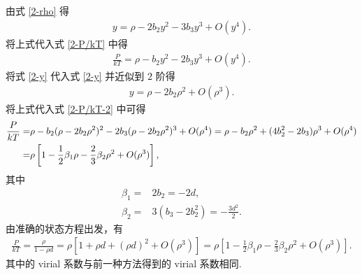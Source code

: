 \documentclass{assignment}
\begin{document}
\begin{sol}
    由式 \eqref{2-rho} 得
    \begin{align}
        \label{2-y}
        y=\rho-2b_2y^2-3b_3y^3+O(y^4).
    \end{align}
    将上式代入式 \eqref{2-P/kT} 中得
    \begin{align}
        \label{2-P/kT-2}
        \frac{P}{kT}=\rho-b_2y^2-2b_3y^3+O(y^4).
    \end{align}
    将式 \eqref{2-y} 代入式 \eqref{2-y} 并近似到 $2$ 阶得
    \begin{align}
        y=\rho-2b_2\rho^2+O(\rho^3).
    \end{align}
    将上式代入式 \eqref{2-P/kT-2} 中可得
    \begin{align}
        \notag\frac{P}{kT}=&\rho-b_2(\rho-2b_2\rho^2)^2-2b_3(\rho-2b_2\rho^2)^3+O(\rho^4)=\rho-b_2\rho^2+(4b_2^2-2b_3)\rho^3+O(\rho^4)\\
        =&\rho\left[1-\frac{1}{2}\beta_1\rho-\frac{2}{3}\beta_2\rho^2+O(\rho^3)\right],
    \end{align}
    其中
    \begin{align}
        \beta_1=&2b_2=-2d,\\
        \beta_2=&3(b_3-2b_2^2)=-\frac{3d^2}{2}.
    \end{align}
    由准确的状态方程出发，有
    \begin{align}
        \frac{P}{kT}=\frac{\rho}{1-\rho d}=\rho\left[1+\rho d+(\rho d)^2+O(\rho^3)\right]=\rho\left[1-\frac{1}{2}\beta_1\rho-\frac{2}{3}\beta_2\rho^2+O(\rho^3)\right].
    \end{align}
    其中的 virial 系数与前一种方法得到的 virial 系数相同.
\end{sol}
\end{document}
